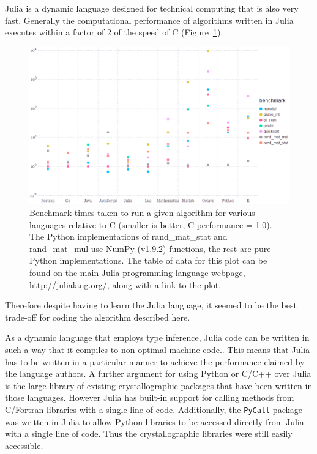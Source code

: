 Julia is a dynamic language designed for technical computing \cite{bezanson2014julia,bezanson2012julia} that is also very fast.
Generally the computational performance of algorithms written in Julia executes within a factor of 2 of the speed of C (Figure~\ref{fig:Language performance benchmarks}).
\begin{figure}[ht!]
    \centering
    \includegraphics[width=1.0\textwidth]{figures/datared/language_benchmarks.png}
    \caption[Benchmark times taken to run a given algorithm for various languages relative to C.]{Benchmark times taken to run a given algorithm for various languages relative to C (smaller is better, C performance = 1.0).
    The Python implementations of rand\_mat\_stat and rand\_mat\_mul use NumPy (v1.9.2) functions, the rest are pure Python implementations.
    The table of data for this plot can be found on the main Julia programming language webpage, \url{http://julialang.org/}, along with a link to the plot.}
    \label{fig:Language performance benchmarks}
\end{figure}
Therefore despite having to learn the Julia language, it seemed to be the best trade-off for coding the algorithm described here.

As a dynamic language that employs type inference, Julia code can be written in such a way that it compiles to non-optimal machine code..
This means that Julia has to be written in a particular manner to achieve the performance claimed by the language authors.
A further argument for using Python or C/C++ over Julia is the large library of existing crystallographic packages that have been written in those languages.
However Julia has built-in support for calling methods from C/Fortran libraries with a single line of code.
Additionally, the \verb+PyCall+ package was written in Julia to allow Python libraries to be accessed directly from Julia with a single line of code.
Thus the crystallographic libraries were still easily accessible.
